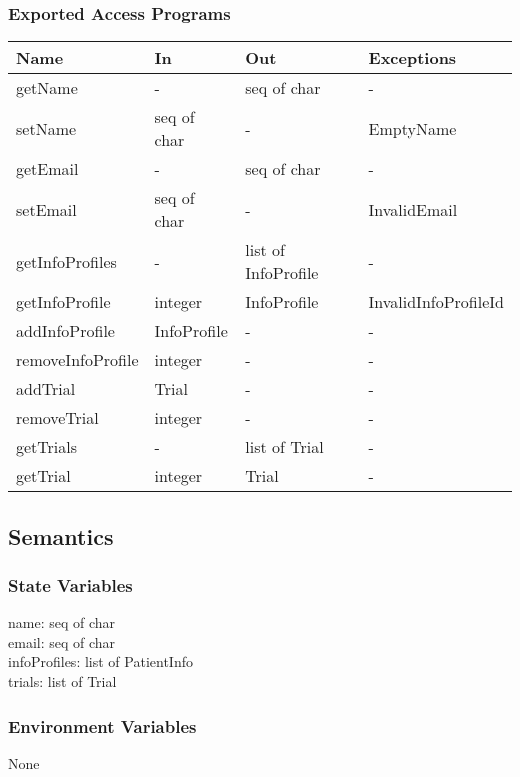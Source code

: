 \documentclass[12pt, titlepage]{article}
\begin{document}
\subsubsection{Exported Access Programs}

\begin{center}
\begin{tabular}{p{4cm} p{4cm} p{4cm} p{4cm}}
\hline
\textbf{Name} & \textbf{In} & \textbf{Out} & \textbf{Exceptions} \\
\hline
getName & - & seq of char & - \\
\hline
setName & seq of char & - & EmptyName \\
\hline
getEmail & - & seq of char & - \\
\hline
setEmail & seq of char & - & InvalidEmail \\
\hline
getInfoProfiles  & - & list of InfoProfile & - \\
\hline
getInfoProfile & integer & InfoProfile & InvalidInfoProfileId \\
\hline
addInfoProfile & InfoProfile & - & - \\
\hline
removeInfoProfile & integer & - & - \\
\hline
addTrial & Trial & - & - \\
\hline
removeTrial & integer & - & - \\
\hline
getTrials & - & list of Trial & - \\
\hline
getTrial & integer & Trial & - \\
\end{tabular}
\end{center}

\subsection{Semantics}

\subsubsection{State Variables}

name: seq of char\\
email: seq of char\\
infoProfiles: list of PatientInfo\\
trials: list of Trial

\subsubsection{Environment Variables}
None
\end{document}
